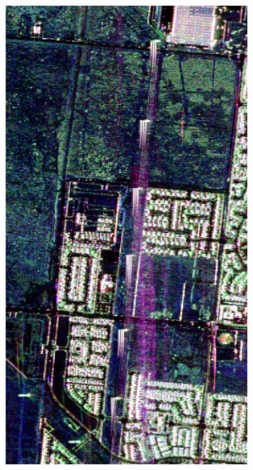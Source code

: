 \begin{figure}[t]
\begin{subfigure}[b]{0.2\columnwidth}
		\includegraphics[width=\textwidth]{Figures/CD/A2_2015}
		\caption{}
		\label{fig:3_b}
\end{subfigure}
\hspace{0.01pt}
\begin{subfigure}[b]{0.2\columnwidth}

\end{subfigure}
\end{figure}
